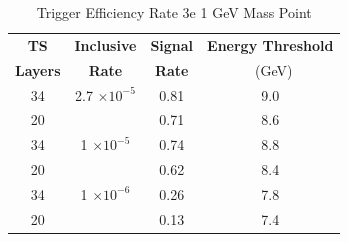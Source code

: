 \begin{table}
 \centering
\caption{Trigger Efficiency Rate 3e 1 GeV Mass Point}
\begin{tabular}{ c | c | c | c }
\textbf{TS} & \textbf{Inclusive} & \textbf{Signal} & \textbf{Energy Threshold}  \\ \textbf{Layers} & \textbf{Rate} & \textbf{Rate} & \ (GeV) \\ 
\hline
34 & 2.7 $\times 10^{-5}$ & 0.81 & 9.0 \\ 
20 & & 0.71 & 8.6 \\ 
\hline 
34 & 1 $\times 10^{-5}$ & 0.74 & 8.8 \\ 
20 & & 0.62 & 8.4 \\ 
\hline 
34 & 1 $\times 10^{-6}$ & 0.26 & 7.8 \\ 
20 & & 0.13 & 7.4 \\ 
\hline 
\end{tabular}
\end{table}
